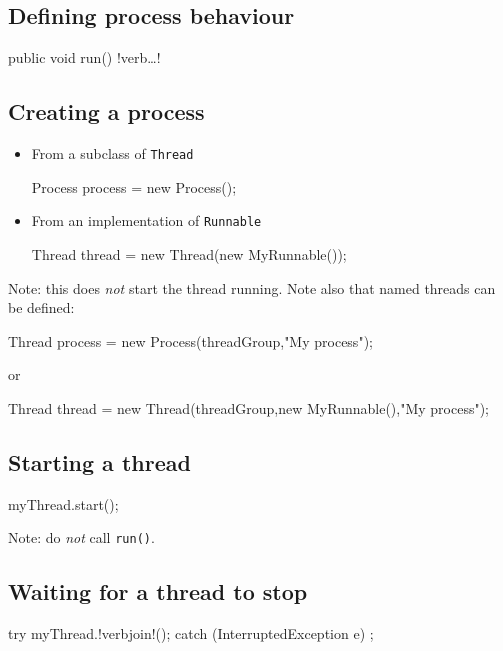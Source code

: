 \documentclass{article}
\begin{document}
\subsection{Defining process behaviour}
\begin{flushleft}
public void run() {
  !verb\ldots!
}
\EndSystem
\end{flushleft}

\subsection{Creating a process}
\begin{itemize}
\item From a subclass of {\tt Thread}
\begin{flushleft}
Process process = new Process();
\EndSystem
\end{flushleft}
\item From an implementation of {\tt Runnable}
\begin{flushleft}
Thread thread = new Thread(new MyRunnable());
\EndSystem
\end{flushleft}
\end{itemize}
Note: this does {\em not} start the thread running.
Note also that named threads can be defined:
\begin{flushleft}
Thread process = new Process(threadGroup,"My process");
\EndSystem
\end{flushleft}
or 
\begin{flushleft}
Thread thread = new Thread(threadGroup,new MyRunnable(),"My process");
\EndSystem
\end{flushleft}

\subsection{Starting a thread}
\begin{flushleft}
myThread.start();
\EndSystem
\end{flushleft}
Note: do {\em not} call {\tt run()}.
\subsection{Waiting for a thread to stop}
\begin{flushleft}
try {
	myThread.!verbjoin!();
} catch (InterruptedException e) {};
\EndSystem
\end{flushleft}
\end{document}
